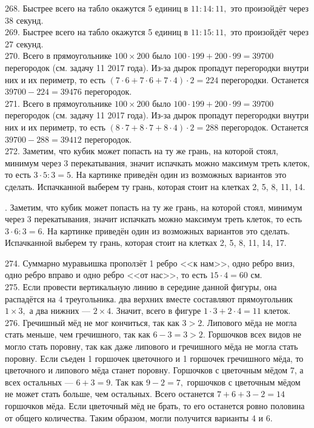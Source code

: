 268. Быстрее всего на табло окажутся 5 единиц в $11:14:11,$ это произойдёт через 38 секунд.\\
269. Быстрее всего на табло окажутся 5 единиц в $11:15:11,$ это произойдёт через 27 секунд.\\
270. Всего в прямоугольнике $100\times200$ было $100\cdot199+200\cdot99=39700$ перегородок (см. задачу 11 2017 года). Из-за дырок пропадут перегородки внутри них и их периметр, то есть $(7\cdot6+7\cdot6+7\cdot4)\cdot2=224$ перегородки. Останется $39700-224=39476$ перегородок.\\
271. Всего в прямоугольнике $100\times200$ было $100\cdot199+200\cdot99=39700$ перегородок (см. задачу 11 2017 года). Из-за дырок пропадут перегородки внутри них и их периметр, то есть $(8\cdot7+8\cdot7+8\cdot4)\cdot2=288$ перегородок. Останется $39700-288=39412$ перегородок.\\
272. Заметим, что кубик может попасть на ту же грань, на которой стоял, минимум через 3 перекатывания, значит испачкать можно максимум треть клеток, то есть $3\cdot5:3=5.$ На картинке приведён один из возможных вариантов это сделать. Испачканной выберем ту грань, которая стоит на клетках 2, 5, 8, 11, 14.
\begin{center}
\begin{figure}[ht!]
\end{figure}
\end{center}
\newpage{}. Заметим, что кубик может попасть на ту же грань, на которой стоял, минимум через 3 перекатывания, значит испачкать можно максимум треть клеток, то есть $3\cdot6:3=6.$ На картинке приведён один из возможных вариантов это сделать. Испачканной выберем ту грань, которая стоит на клетках 2, 5, 8, 11, 14, 17.
\begin{center}
\begin{figure}[ht!]
\end{figure}
\end{center}
274. Суммарно муравьишка проползёт 1 ребро <<к нам>>, одно ребро вниз, одно ребро вправо и одно ребро <<от нас>>, то есть $15\cdot4=60$ см.\\
275. Если провести вертикальную линию в середине данной фигуры, она распадётся на 4 треугольника. два верхних вместе составляют прямоугольник $1\times3,$ а два нижних --- $2\times4.$ Значит, всего в фигуре $1\cdot3+2\cdot4=11$ клеток.\\
276. Гречишный мёд не мог кончиться, так как $3>2.$ Липового мёда не могла стать меньше, чем гречишного, так как $6-3=3>2.$ Горшочков всех видов не могло стать поровну, так как даже липового и гречишного мёда не могла стать поровну. Если съеден 1 горшочек цветочного и 1 горшочек гречишного мёда, то цветочного и липового мёда станет поровну. Горшочков с цветочным мёдом 7, а всех остальных --- $6+3=9.$ Так как $9-2=7,$ горшочков с цветочным мёдом не может стать больше, чем остальных. Всего останется $7+6+3-2=14$ горшочков мёда. Если цветочный мёд не брать, то его останется ровно половина от общего количества. Таким образом, могли получится варианты 4 и 6.\\
